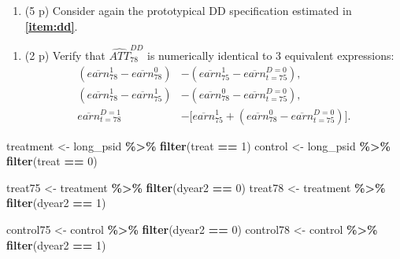 \documentclass[
]{article}
\newenvironment{Shaded}{\begin{snugshade}}{\end{snugshade}}
\newcommand{\DecValTok}[1]{\textcolor[rgb]{0.00,0.00,0.81}{#1}}
\newcommand{\FunctionTok}[1]{\textcolor[rgb]{0.13,0.29,0.53}{\textbf{#1}}}
\newcommand{\NormalTok}[1]{#1}
\newcommand{\OtherTok}[1]{\textcolor[rgb]{0.56,0.35,0.01}{#1}}
\newcommand{\SpecialCharTok}[1]{\textcolor[rgb]{0.81,0.36,0.00}{\textbf{#1}}}
\providecommand{\tightlist}{%
  \setlength{\itemsep}{0pt}\setlength{\parskip}{0pt}}
\begin{document}
\begin{enumerate}
\def\labelenumi{\arabic{enumi}.}
\setcounter{enumi}{6}
\tightlist
\item
  (5 p) Consider again the prototypical DD specification estimated in
  \textbf{\ref{item:dd}}.
\end{enumerate}

\begin{enumerate}
\def\labelenumi{\alph{enumi}.}
\tightlist
\item
  (2 p) Verify that \(\widehat{ATT}_{78}^{DD}\) is numerically identical
  to 3 equivalent expressions:\label{item:DinD-diff} \begin{align}
   \left( \overline{earn}_{78}^{1}-\overline{earn}_{78}^{0}\right) &-\left( \overline{earn}_{75}^{1}-\overline{earn}_{t=75}^{D=0}\right),\label{eq:DDv1} \\
   \left( \overline{earn}_{78}^{1} -\overline{earn}_{75}^{1}\right) &-\left( \overline{earn}_{78}^{0}-\overline{earn}_{t=75}^{D=0}\right),\label{eq:DDv2} \\ 
   \overline{earn}_{t=78}^{D=1} &- \big[ \overline{earn}_{75}^{1}+ \left( \overline{earn}_{78}^{0}-\overline{earn}_{t=75}^{D=0}\right) \big].\label{eq:DDv3}
   \end{align}
\end{enumerate}

\begin{Shaded}
\begin{Highlighting}[]
\NormalTok{treatment }\OtherTok{\textless{}{-}}\NormalTok{ long\_psid }\SpecialCharTok{\%\textgreater{}\%} \FunctionTok{filter}\NormalTok{(treat }\SpecialCharTok{==} \DecValTok{1}\NormalTok{)}
\NormalTok{control }\OtherTok{\textless{}{-}}\NormalTok{ long\_psid }\SpecialCharTok{\%\textgreater{}\%} \FunctionTok{filter}\NormalTok{(treat }\SpecialCharTok{==} \DecValTok{0}\NormalTok{)}

\NormalTok{treat75 }\OtherTok{\textless{}{-}}\NormalTok{ treatment }\SpecialCharTok{\%\textgreater{}\%} \FunctionTok{filter}\NormalTok{(dyear2 }\SpecialCharTok{==} \DecValTok{0}\NormalTok{)}
\NormalTok{treat78 }\OtherTok{\textless{}{-}}\NormalTok{ treatment }\SpecialCharTok{\%\textgreater{}\%} \FunctionTok{filter}\NormalTok{(dyear2 }\SpecialCharTok{==} \DecValTok{1}\NormalTok{)}

\NormalTok{control75 }\OtherTok{\textless{}{-}}\NormalTok{ control }\SpecialCharTok{\%\textgreater{}\%} \FunctionTok{filter}\NormalTok{(dyear2 }\SpecialCharTok{==} \DecValTok{0}\NormalTok{)}
\NormalTok{control78 }\OtherTok{\textless{}{-}}\NormalTok{ control }\SpecialCharTok{\%\textgreater{}\%} \FunctionTok{filter}\NormalTok{(dyear2 }\SpecialCharTok{==} \DecValTok{1}\NormalTok{)}
\end{Highlighting}
\end{Shaded}
\end{document}

